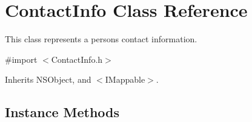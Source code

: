 \hypertarget{interface_contact_info}{}\section{Contact\+Info Class Reference}
\label{interface_contact_info}


This class represents a person\textquotesingle{}s contact information.  




{\ttfamily \#import $<$Contact\+Info.\+h$>$}



Inherits N\+S\+Object, and $<$\+I\+Mappable$>$.

\subsection*{Instance Methods}
